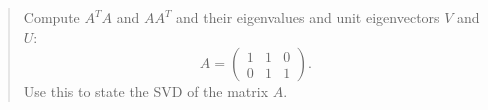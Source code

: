 \documentclass{exercise}
\begin{document}
	\section{}

	\begin{quote}
		Compute \(A^T A\) and \(AA^T\) and their eigenvalues and unit eigenvectors \(V\) and \(U\):
		\begin{equation}
			A = \begin{pmatrix}
				1 & 1 & 0\\
				0 & 1 & 1
			\end{pmatrix}.
		\end{equation}
		Use this to state the SVD of the matrix \(A\).
	\end{quote}
\end{document}
